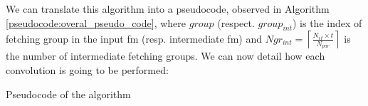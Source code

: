 We can translate this algorithm into a pseudocode, observed in Algorithm \ref{pseudocode:overal_pseudo_code}, where $group$ (respect. $group_{int}$) is the index of fetching group in the input \acrshort{fm} (resp. intermediate \acrshort{fm}) and $Ngr_{int} = \left\lceil \frac{N_{if} \times t}{N_{par}} \right\rceil$ is the number of intermediate fetching groups. We can now detail how each convolution is going to be performed:
%
\begin{algorithm}[H]
    \centering
    \begin{algorithmic}
        \EndFor
    \end{algorithmic}
    \caption{Pseudocode of the algorithm}
    \label{pseudocode:overal_pseudo_code}
\end{algorithm}
%
